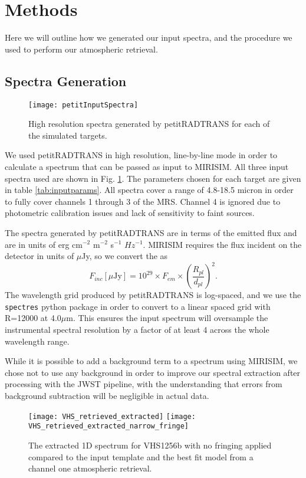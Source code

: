 \section{Methods}
Here we will outline how we generated our input spectra, and the procedure we used to perform our atmospheric retrieval.
\subsection{Spectra Generation}
\begin{figure}[t]
	\texttt{[image: petitInputSpectra]}
	\caption{High resolution spectra generated by petitRADTRANS for each of the simulated targets.}
	\label{fig:petitinput}
\end{figure}
We used petitRADTRANS in high resolution, line-by-line mode in order to calculate a spectrum that can be passed as input to MIRISIM.
All three input spectra used are shown in Fig. \ref{fig:petitinput}.
The parameters chosen for each target are given in table \ref{tab:inputparams}. 
All spectra cover a range of 4.8-18.5 micron in order to fully cover channels 1 through 3 of the MRS. 
Channel 4 is ignored due to photometric calibration issues and lack of sensitivity to faint sources.

The spectra generated by petitRADTRANS are in terms of the emitted flux and are in units of erg cm$^{-2}$ m$^{-2}$ s$^{-1}$ $Hz^{-1}$. 
MIRISIM requires the flux incident on the detector in units of $\mu$Jy, so we convert the as 
\begin{equation}
F_{inc} [\mu\textrm{Jy}] = 10^{29}\times F_{em} \times \left(\frac{R_{pl}}{d_{pl}}\right)^{2}.
\end{equation}
The wavelength grid produced by petitRADTRANS is log-spaced, and we use the \verb|spectres| python package \parencite{Carnall2017} in order to convert to a linear spaced grid with R=12000 at 4.0$\mu$m. 
This ensures the input spectrum will oversample the instrumental spectral resolution by a factor of at least 4 across the whole wavelength range.

While it is possible to add a background term to a spectrum using MIRISIM, we chose not to use any background in order to improve our spectral extraction after processing with the JWST pipeline, with the understanding that errors from background subtraction will be negligible in actual data.
\begin{figure}[t]
	\texttt{[image: VHS\_retrieved\_extracted]}
	\texttt{[image: VHS\_retrieved\_extracted\_narrow\_fringe]}
	\caption{The extracted 1D spectrum for VHS1256b with no fringing applied compared to the input template and the best fit model from a channel one atmospheric retrieval.}
	\label{fig:vhsnofringeextractedbestfit}
\end{figure}
